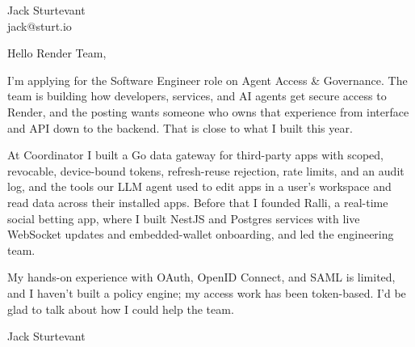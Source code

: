\documentclass[11pt]{article}
\begin{document}
\raggedright

{\namefont\fontsize{20pt}{24pt}\selectfont Jack Sturtevant}\\[-0.3em]
jack@sturt.io

\vspace{1.2em}

Hello Render Team,

I'm applying for the Software Engineer role on Agent Access \& Governance. The team is building how developers, services, and AI agents get secure access to Render, and the posting wants someone who owns that experience from interface and API down to the backend. That is close to what I built this year.

At Coordinator I built a Go data gateway for third-party apps with scoped, revocable, device-bound tokens, refresh-reuse rejection, rate limits, and an audit log, and the tools our LLM agent used to edit apps in a user's workspace and read data across their installed apps. Before that I founded Ralli, a real-time social betting app, where I built NestJS and Postgres services with live WebSocket updates and embedded-wallet onboarding, and led the engineering team.

My hands-on experience with OAuth, OpenID Connect, and SAML is limited, and I haven't built a policy engine; my access work has been token-based. I'd be glad to talk about how I could help the team.

\vspace{0.6em}
Jack Sturtevant
\end{document}
